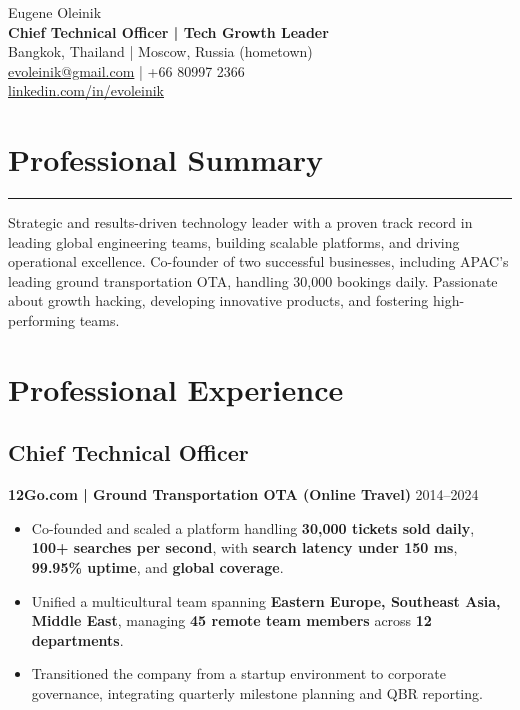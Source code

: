 \documentclass[11pt,a4paper]{article}
\begin{document}
\begin{center}
    {\Huge Eugene Oleinik} \\
    \vspace{0.5em}
    \textbf{Chief Technical Officer | Tech Growth Leader} \\
    \vspace{0.5em}
    Bangkok, Thailand | Moscow, Russia (hometown) \\
    \href{mailto:evoleinik@gmail.com}{evoleinik@gmail.com} | +66 80997 2366 \\
    \href{http://linkedin.com/in/evoleinik}{linkedin.com/in/evoleinik}
\end{center}

\section*{Professional Summary}
\hrule
Strategic and results-driven technology leader with a proven track record in leading global engineering teams, building scalable platforms, and driving operational excellence. Co-founder of two successful businesses, including APAC’s leading ground transportation OTA, handling 30,000 bookings daily. Passionate about growth hacking, developing innovative products, and fostering high-performing teams.

\section*{Professional Experience}

\subsection*{Chief Technical Officer}
\textbf{12Go.com | Ground Transportation OTA (Online Travel)} \hfill 2014--2024
\begin{itemize}
    \item Co-founded and scaled a platform handling \textbf{30,000 tickets sold daily}, \textbf{100+ searches per second}, with \textbf{search latency under 150 ms}, \textbf{99.95\% uptime}, and \textbf{global coverage}.
    \item Unified a multicultural team spanning \textbf{Eastern Europe, Southeast Asia, Middle East}, managing \textbf{45 remote team members} across \textbf{12 departments}.
    \item Transitioned the company from a startup environment to corporate governance, integrating quarterly milestone planning and QBR reporting.
\end{itemize}
\end{document}
